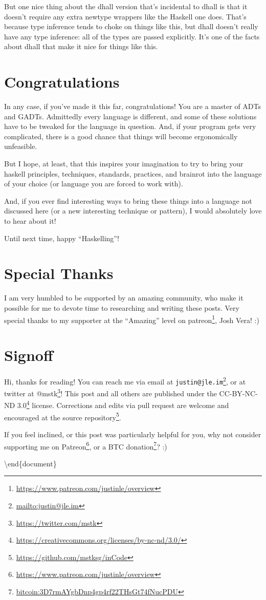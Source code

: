 \documentclass[]{article}
\renewcommand{\href}[2]{#2\footnote{\url{#1}}}
\begin{document}
But one nice thing about the dhall version that's incidental to dhall is that it
doesn't require any extra newtype wrappers like the Haskell one does. That's
because type inference tends to choke on things like this, but dhall doesn't
really have any type inference: all of the types are passed explicitly. It's one
of the facts about dhall that make it nice for things like this.

\section{Congratulations}\label{congratulations}

In any case, if you've made it this far, congratulations! You are a master of
ADTs and GADTs. Admittedly every language is different, and some of these
solutions have to be tweaked for the language in question. And, if your program
gets very complicated, there is a good chance that things will become
ergonomically unfeasible.

But I hope, at least, that this inspires your imagination to try to bring your
haskell principles, techniques, standards, practices, and brainrot into the
language of your choice (or language you are forced to work with).

And, if you ever find interesting ways to bring these things into a language not
discussed here (or a new interesting technique or pattern), I would absolutely
love to hear about it!

Until next time, happy ``Haskelling''!

\section{Special Thanks}\label{special-thanks}

I am very humbled to be supported by an amazing community, who make it possible
for me to devote time to researching and writing these posts. Very special
thanks to my supporter at the ``Amazing'' level on
\href{https://www.patreon.com/justinle/overview}{patreon}, Josh Vera! :)

\section{Signoff}\label{signoff}

Hi, thanks for reading! You can reach me via email at
\href{mailto:justin@jle.im}{\nolinkurl{justin@jle.im}}, or at twitter at
\href{https://twitter.com/mstk}{@mstk}! This post and all others are published
under the \href{https://creativecommons.org/licenses/by-nc-nd/3.0/}{CC-BY-NC-ND
3.0} license. Corrections and edits via pull request are welcome and encouraged
at \href{https://github.com/mstksg/inCode}{the source repository}.

If you feel inclined, or this post was particularly helpful for you, why not
consider \href{https://www.patreon.com/justinle/overview}{supporting me on
Patreon}, or a \href{bitcoin:3D7rmAYgbDnp4gp4rf22THsGt74fNucPDU}{BTC donation}?
:)

\textbackslash end\{document\}
\end{document}
